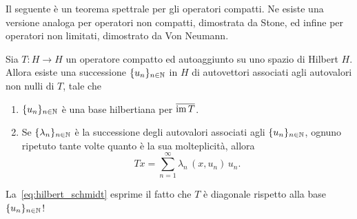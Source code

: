 Il seguente è un teorema spettrale per gli operatori compatti. Ne esiste una versione analoga per operatori non compatti, dimostrata da Stone, ed infine per operatori non limitati, dimostrato da Von Neumann.

\begin{theorem}
	Sia $T:H \to H$ un operatore compatto ed autoaggiunto su uno spazio di Hilbert $H$.
	Allora esiste una successione $\{u_n\}_{n \in \mathbb{N}}$ in $H$ di autovettori associati agli autovalori non nulli di $T$, tale che
	\begin{enumerate}
		\item $\{u_n\}_{n \in \mathbb{N}}$ è una base hilbertiana per $\overline{\operatorname{im} T}$.
		\item Se $\{\lambda_n\}_{n \in \mathbb{N}}$ è la successione degli autovalori associati agli $\{u_n\}_{n \in \mathbb{N}}$, ognuno ripetuto tante volte quanto è la sua molteplicità, allora
		\begin{equation}
		\label{eq:hilbert_schmidt}
			Tx = \sum_{n=1}^\infty \lambda_n\, (x,u_n)\,u_n.
		\end{equation}
	\end{enumerate}
\end{theorem}
\begin{remark}
	La~\eqref{eq:hilbert_schmidt} esprime il fatto che $T$ è diagonale rispetto alla base $\{u_n\}_{n \in \mathbb{N}}$!
\end{remark}
